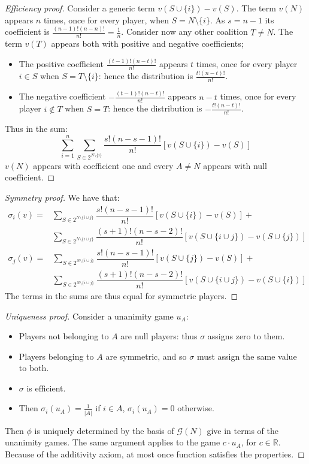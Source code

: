 \begin{proof}[Efficiency proof]
    Consider a generic term $v(S\cup\{i\})-v(S)$. 
    The term $v(N)$ appears $n$ times, once for every player, when $S=N\setminus\{i\}$. 
    As $s=n-1$ its coefficient is $\frac{(n-1)!(n-n)!}{n!}=\frac{1}{n}$. 
    Consider now any other coalition $T\neq N$. 
    The term $v(T)$ appears both with positive and negative coefficients; 
    \begin{itemize}
        \item The positive coefficient $\frac{(t-1)!(n-t)!}{n!}$ appears $t$ times, once for every player $i\in S$ when $S=T\setminus\{i\}$: hence the distribution is $\frac{t!(n-t)!}{n!}$.
        \item The negative coefficient $-\frac{(t-1)!(n-t)!}{n!}$ appears $n-t$ times, once for every player $i\notin T$ when $S=T$: hence the distribution is $-\frac{t!(n-t)!}{n!}$.
    \end{itemize}
    Thus in the sum: 
    \[\sum_{i=1}^{n}\sum_{S\in 2^{N\setminus\{i\}}}\dfrac{s!(n-s-1)!}{n!}\left[v(S\cup\{i\})-v(S)\right]\]
    $v(N)$ appears with coefficient one and every $A\neq N$ appears with null coefficient. 
\end{proof}
\begin{proof}[Symmetry proof]
    We have that: 
    \begin{align*}
        \sigma_i(v)=&\sum_{S\in 2^{N\setminus\{i\cup j\}}}\dfrac{s!(n-s-1)!}{n!}\left[v(S\cup\{i\})-v(S)\right]+ \\
                    &\sum_{S\in 2^{N\setminus\{i\cup j\}}}\dfrac{(s+1)!(n-s-2)!}{n!}\left[v(S\cup\{i\cup j\})-v(S\cup\{j\})\right]
    \end{align*}
    \begin{align*}
        \sigma_j(v)=&\sum_{S\in 2^{N\setminus\{i\cup j\}}}\dfrac{s!(n-s-1)!}{n!}\left[v(S\cup\{j\})-v(S)\right]+ \\
                    &\sum_{S\in 2^{N\setminus\{i\cup j\}}}\dfrac{(s+1)!(n-s-2)!}{n!}\left[v(S\cup\{i\cup j\})-v(S\cup\{i\})\right]
    \end{align*}
    The terms in the sums are thus equal for symmetric players. 
\end{proof}
\begin{proof}[Uniqueness proof]
    Consider a unanimity game $u_A$: 
    \begin{itemize}
        \item Players not belonging to $A$ are null players: thus $\sigma$ assigns zero to them. 
        \item Players belonging to $A$ are symmetric, and so $\sigma$ must assign the same value to both. 
        \item $\sigma$ is efficient. 
        \item Then $\sigma_i(u_A)=\frac{1}{\left\lvert A\right\rvert}$ if $i\in A$, $\sigma_i(u_A)=0$ otherwise. 
    \end{itemize}
    Then $\phi$ is uniquely determined by the basis of $\mathcal{G}(N)$ give in terms of the unanimity games. 
    The same argument applies to the game $c\cdot u_A$, for $c \in \mathbb{R}$. 
    Because of the additivity axiom, at most once function satisfies the properties. 
\end{proof}

